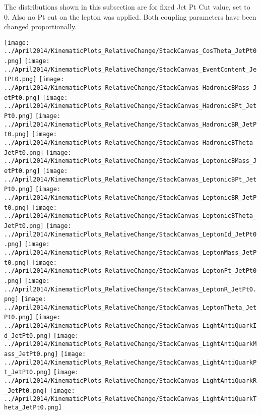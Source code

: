 \documentclass[a4paper,12pt]{report}
\begin{document}
The distributions shown in this subsection are for fixed Jet Pt Cut value, set to 0. Also no Pt cut on the lepton was applied. Both coupling parameters have been changed proportionally.
\begin{center}
\texttt{[image: ../April2014/KinematicPlots\_RelativeChange/StackCanvas\_CosTheta\_JetPt0.png]}
\texttt{[image: ../April2014/KinematicPlots\_RelativeChange/StackCanvas\_EventContent\_JetPt0.png]}
\texttt{[image: ../April2014/KinematicPlots\_RelativeChange/StackCanvas\_HadronicBMass\_JetPt0.png]}
\texttt{[image: ../April2014/KinematicPlots\_RelativeChange/StackCanvas\_HadronicBPt\_JetPt0.png]}
\texttt{[image: ../April2014/KinematicPlots\_RelativeChange/StackCanvas\_HadronicBR\_JetPt0.png]}
\texttt{[image: ../April2014/KinematicPlots\_RelativeChange/StackCanvas\_HadronicBTheta\_JetPt0.png]}
\texttt{[image: ../April2014/KinematicPlots\_RelativeChange/StackCanvas\_LeptonicBMass\_JetPt0.png]}
\texttt{[image: ../April2014/KinematicPlots\_RelativeChange/StackCanvas\_LeptonicBPt\_JetPt0.png]}
\texttt{[image: ../April2014/KinematicPlots\_RelativeChange/StackCanvas\_LeptonicBR\_JetPt0.png]}
\texttt{[image: ../April2014/KinematicPlots\_RelativeChange/StackCanvas\_LeptonicBTheta\_JetPt0.png]}
\texttt{[image: ../April2014/KinematicPlots\_RelativeChange/StackCanvas\_LeptonId\_JetPt0.png]}
\texttt{[image: ../April2014/KinematicPlots\_RelativeChange/StackCanvas\_LeptonMass\_JetPt0.png]}
\texttt{[image: ../April2014/KinematicPlots\_RelativeChange/StackCanvas\_LeptonPt\_JetPt0.png]}
\texttt{[image: ../April2014/KinematicPlots\_RelativeChange/StackCanvas\_LeptonR\_JetPt0.png]}
\texttt{[image: ../April2014/KinematicPlots\_RelativeChange/StackCanvas\_LeptonTheta\_JetPt0.png]}
\texttt{[image: ../April2014/KinematicPlots\_RelativeChange/StackCanvas\_LightAntiQuarkId\_JetPt0.png]}
\texttt{[image: ../April2014/KinematicPlots\_RelativeChange/StackCanvas\_LightAntiQuarkMass\_JetPt0.png]}
\texttt{[image: ../April2014/KinematicPlots\_RelativeChange/StackCanvas\_LightAntiQuarkPt\_JetPt0.png]}
\texttt{[image: ../April2014/KinematicPlots\_RelativeChange/StackCanvas\_LightAntiQuarkR\_JetPt0.png]}
\texttt{[image: ../April2014/KinematicPlots\_RelativeChange/StackCanvas\_LightAntiQuarkTheta\_JetPt0.png]}

\end{center}
\end{document}
